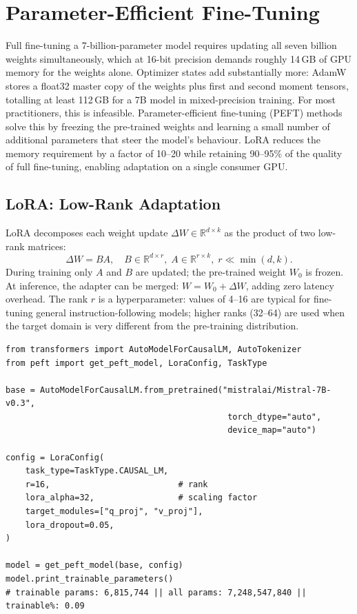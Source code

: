 \section{Parameter-Efficient Fine-Tuning}
\label{app:hf:peft}

\begin{context}
Full fine-tuning a 7-billion-parameter model requires updating all seven
billion weights simultaneously, which at 16-bit precision demands roughly
14\,GB of GPU memory for the weights alone.  Optimizer states add substantially
more: AdamW stores a float32 master copy of the weights plus first and second
moment tensors, totalling at least 112\,GB for a 7B model in mixed-precision
training.  For most practitioners, this is infeasible.  Parameter-efficient fine-tuning (PEFT) methods solve this by
freezing the pre-trained weights and learning a small number of additional
parameters that steer the model's behaviour.  LoRA reduces the memory
requirement by a factor of 10--20 while retaining 90--95\% of the quality of
full fine-tuning, enabling adaptation on a single consumer GPU.
\end{context}

\subsection{LoRA: Low-Rank Adaptation}
\label{app:hf:lora}

LoRA \citep{hu2022lora} decomposes each weight update $\Delta W \in
\mathbb{R}^{d \times k}$ as the product of two low-rank matrices:
\begin{equation}
  \Delta W = B A, \quad B \in \mathbb{R}^{d \times r},\; A \in \mathbb{R}^{r \times k},\; r \ll \min(d, k).
  \label{eq:lora-hf}
\end{equation}
During training only $A$ and $B$ are updated; the pre-trained weight $W_0$
is frozen.  At inference, the adapter can be merged: $W = W_0 + \Delta W$,
adding zero latency overhead.  The rank $r$ is a hyperparameter: values of
4--16 are typical for fine-tuning general instruction-following models;
higher ranks (32--64) are used when the target domain is very different from
the pre-training distribution.

\begin{verbatim}
from transformers import AutoModelForCausalLM, AutoTokenizer
from peft import get_peft_model, LoraConfig, TaskType

base = AutoModelForCausalLM.from_pretrained("mistralai/Mistral-7B-v0.3",
                                             torch_dtype="auto",
                                             device_map="auto")

config = LoraConfig(
    task_type=TaskType.CAUSAL_LM,
    r=16,                          # rank
    lora_alpha=32,                 # scaling factor
    target_modules=["q_proj", "v_proj"],
    lora_dropout=0.05,
)

model = get_peft_model(base, config)
model.print_trainable_parameters()
# trainable params: 6,815,744 || all params: 7,248,547,840 || trainable%: 0.09
\end{verbatim}

